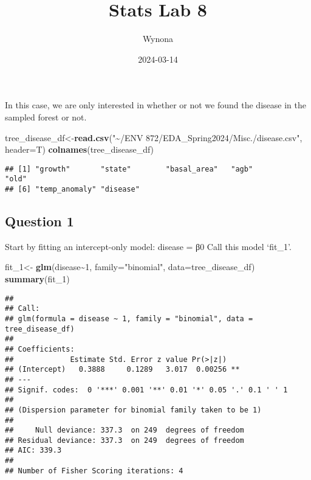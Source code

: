 \documentclass[
]{article}
\title{Stats Lab 8}
\author{Wynona}
\date{2024-03-14}
\newenvironment{Shaded}{\begin{snugshade}}{\end{snugshade}}
\newcommand{\AttributeTok}[1]{\textcolor[rgb]{0.13,0.29,0.53}{#1}}
\newcommand{\DecValTok}[1]{\textcolor[rgb]{0.00,0.00,0.81}{#1}}
\newcommand{\FunctionTok}[1]{\textcolor[rgb]{0.13,0.29,0.53}{\textbf{#1}}}
\newcommand{\NormalTok}[1]{#1}
\newcommand{\OtherTok}[1]{\textcolor[rgb]{0.56,0.35,0.01}{#1}}
\newcommand{\SpecialCharTok}[1]{\textcolor[rgb]{0.81,0.36,0.00}{\textbf{#1}}}
\newcommand{\StringTok}[1]{\textcolor[rgb]{0.31,0.60,0.02}{#1}}
\begin{document}
\maketitle

In this case, we are only interested in whether or not we found the
disease in the sampled forest or not.

\begin{Shaded}
\begin{Highlighting}[]
\NormalTok{tree\_disease\_df}\OtherTok{\textless{}{-}}\FunctionTok{read.csv}\NormalTok{(}\StringTok{"\textasciitilde{}/ENV 872/EDA\_Spring2024/Misc./disease.csv"}\NormalTok{, }\AttributeTok{header=}\NormalTok{T)}
\FunctionTok{colnames}\NormalTok{(tree\_disease\_df)}
\end{Highlighting}
\end{Shaded}

\begin{verbatim}
## [1] "growth"       "state"        "basal_area"   "agb"          "old"         
## [6] "temp_anomaly" "disease"
\end{verbatim}

\hypertarget{question-1}{%
\subsection{Question 1}\label{question-1}}

Start by fitting an intercept-only model: disease = β0 Call this model
`fit\_1'.

\begin{Shaded}
\begin{Highlighting}[]
\NormalTok{fit\_1}\OtherTok{\textless{}{-}} \FunctionTok{glm}\NormalTok{(disease}\SpecialCharTok{\textasciitilde{}}\DecValTok{1}\NormalTok{, }\AttributeTok{family=}\StringTok{"binomial"}\NormalTok{, }\AttributeTok{data=}\NormalTok{tree\_disease\_df)}
\FunctionTok{summary}\NormalTok{(fit\_1)}
\end{Highlighting}
\end{Shaded}

\begin{verbatim}
## 
## Call:
## glm(formula = disease ~ 1, family = "binomial", data = tree_disease_df)
## 
## Coefficients:
##             Estimate Std. Error z value Pr(>|z|)   
## (Intercept)   0.3888     0.1289   3.017  0.00256 **
## ---
## Signif. codes:  0 '***' 0.001 '**' 0.01 '*' 0.05 '.' 0.1 ' ' 1
## 
## (Dispersion parameter for binomial family taken to be 1)
## 
##     Null deviance: 337.3  on 249  degrees of freedom
## Residual deviance: 337.3  on 249  degrees of freedom
## AIC: 339.3
## 
## Number of Fisher Scoring iterations: 4
\end{verbatim}
\end{document}
